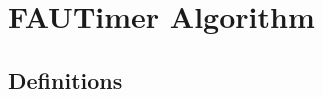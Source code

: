 \documentclass[12pt]{article}
\newcommand{\id}[1]{\mbox{\textit{#1}}}
\begin{document}
\section{FAUTimer Algorithm}
\subsection{Definitions}
 
\end{document}
